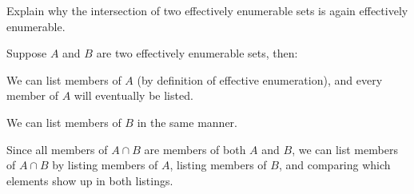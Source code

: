 \begin{problem}
  \begin{enumalph}
    \setcounter{enumi}{1}
      \item Explain why the intersection of two effectively
      enumerable sets is again effectively enumerable.
      \begin{Answer}
        Suppose $A$ and $B$ are two effectively enumerable sets, then:
        \begin{enumroman}
          \item We can list members of $A$ (by definition of effective
            enumeration), and every member of $A$ will eventually
            be listed.
          \item We can list members of $B$ in the same manner.
        \end{enumroman}

        \step
        Since all members of $A \cap B$ are members of both $A$ and $B$,
        we can list members of $A \cap B$ by listing members of $A$,
        listing members of $B$,
        and comparing which elements show up in both listings.
      \end{Answer}
  \end{enumalph}
\end{problem}
